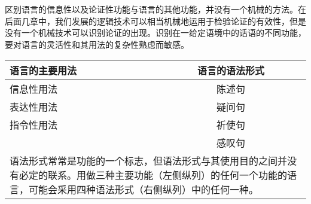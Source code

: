区别语言的信息性以及论证性功能与语言的其他功能，并没有一个机械的方法。在后面几章中，我们发展的逻辑技术可以相当机械地运用于检验论证的有效性，但是没有一个机械技术可以识别论证的出现。识别在一给定语境中的话语的不同功能，要对语言的灵活性和其用法的复杂性熟虑而敏感。

\begin{center}
\begin{tabular}{|l|c|}
\hline
\textbf{语言的主要用法} & \textbf{语言的语法形式} \\
\hline
信息性用法 & 陈述句 \\
\hline
表达性用法 & 疑问句 \\
\hline
指令性用法 & 祈使句 \\
\hline
 & 感叹句 \\
\hline
\multicolumn{2}{|p{0.8\textwidth}|}{语法形式常常是功能的一个标志，但语法形式与其使用目的之间并没有必定的联系。用做三种主要功能（左侧纵列）的任何一个功能的语言，可能会采用四种语法形式（右侧纵列）中的任何一种。} \\
\hline
\end{tabular}
\end{center}

\begin{center}
\end{center} 